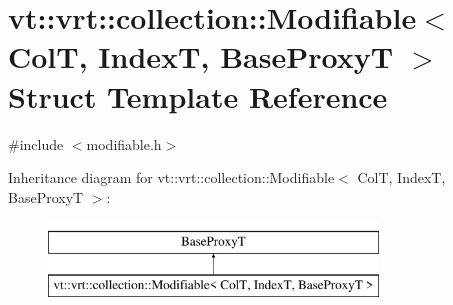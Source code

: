 \hypertarget{structvt_1_1vrt_1_1collection_1_1_modifiable}{}\section{vt\+:\+:vrt\+:\+:collection\+:\+:Modifiable$<$ ColT, IndexT, Base\+ProxyT $>$ Struct Template Reference}
\label{structvt_1_1vrt_1_1collection_1_1_modifiable}


{\ttfamily \#include $<$modifiable.\+h$>$}

Inheritance diagram for vt\+:\+:vrt\+:\+:collection\+:\+:Modifiable$<$ ColT, IndexT, Base\+ProxyT $>$\+:\begin{figure}[H]
\begin{center}
\leavevmode
\includegraphics[height=2.000000cm]{structvt_1_1vrt_1_1collection_1_1_modifiable}
\end{center}
\end{figure}
